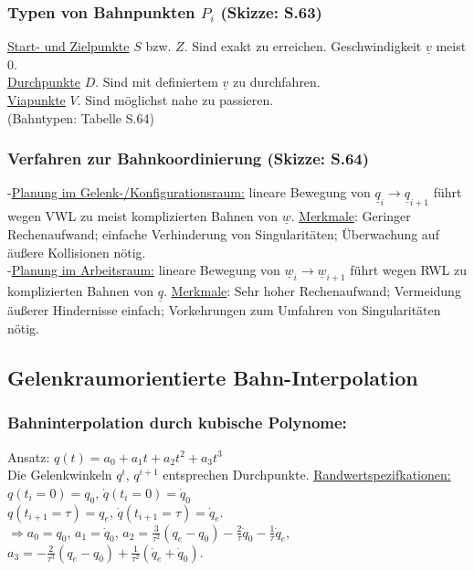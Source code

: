 \documentclass[a4paper,landscape,6pt]{article}
\newcommand{\ul}[1]{\underline{#1}}
\begin{document}
\begin{multicols}{3}
\subsubsection*{Typen von Bahnpunkten $P_i$ \footnotesize{(Skizze: S.63)}}
\ul{Start- und Zielpunkte} $S$ bzw. $Z$. Sind exakt zu erreichen. Geschwindigkeit $\ul v$ meist 0.\\
\ul{Durchpunkte} $D$. Sind mit definiertem $\ul v$ zu durchfahren.\\
\ul{Viapunkte} $V$. Sind möglichst nahe zu passieren.\\

(Bahntypen: Tabelle S.64)
\subsubsection*{Verfahren zur Bahnkoordinierung \footnotesize{(Skizze: S.64)}}
-\ul{Planung im Gelenk-/Konfigurationsraum:} lineare Bewegung von $\ul q_i \rightarrow \ul q_{i+1}$ führt wegen VWL zu meist komplizierten Bahnen von $\ul w$. \ul{Merkmale}: Geringer Rechenaufwand; einfache Verhinderung von Singularitäten; Überwachung auf äußere Kollisionen nötig.\\
-\ul{Planung im Arbeitsraum:} lineare Bewegung von $\ul w_i \rightarrow \ul w_{i+1}$ führt wegen RWL zu komplizierten Bahnen von $\ul q$. \ul{Merkmale}: Sehr hoher Rechenaufwand; Vermeidung äußerer Hindernisse einfach; Vorkehrungen zum Umfahren von Singularitäten nötig.
\subsection*{Gelenkraumorientierte Bahn-Interpolation}
\subsubsection*{Bahninterpolation durch kubische Polynome:}
Ansatz: $q(t) = a_0 + a_1 t + a_2 t^2 + a_3 t^3$\\
Die Gelenkwinkeln $q^i$, $q^{i+1}$ entsprechen Durchpunkte. \ul{Randwertspezifkationen:} $q(t_i = 0) = q_0$, $\dot q(t_i=0) = \dot q_0$\\ $q(t_{i+1} = \tau) = q_e$, $\dot q(t_{i+1}=\tau) = \dot q_e$. \\

$\Rightarrow a_0 = q_0$, $a_1 = \dot q_0$, $a_2 = \frac{3}{\tau^2}(q_e - q_0) - \frac{2}{\tau}\dot q_0 - \frac{1}{\tau} \dot q_e$,\\$a_3 = - \frac{2}{\tau^3}(q_e - q_0) + \frac{1}{\tau^2}(\dot q_e + \dot q_0)$.\\


\end{multicols}
\end{document}
